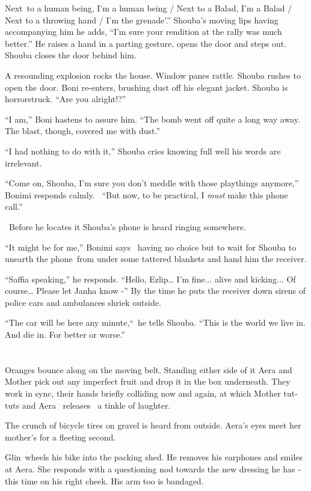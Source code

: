 \documentclass[twoside,11pt]{book}
\begin{document}
Next~to a human being, I'm a human being / Next to a Balad, I'm a Balad / Next to a throwing hand / I'm the
grenade'.'' Shouba's moving lips having accompanying him he adds, ``I'm sure your rendition
at the rally was much better.'' He raises a hand in a parting gesture, opens the door and steps out.
Shouba closes the door behind him.

A resounding explosion rocks the house. Window panes rattle. Shouba rushes to open the door. Boni re-enters, brushing
dust off his elegant jacket. Shouba is horrorstruck. ``Are you alright!?''

``I am,'' Boni hastens to assure him. ``The bomb went off quite a long way away. The blast, though, covered
me with dust.''

``I had nothing to do with it,'' Shouba cries knowing full well his words are irrelevant.

``Come on, Shouba, I'm sure you don't meddle with those playthings anymore,'' Bonimi responds
calmly. \ ``But now, to be practical, I \textit{must }make this phone call.''

\ Before he locates it Shouba's phone is heard ringing somewhere.

``It might be for me,'' Bonimi says \ having no choice but to wait for Shouba to unearth the
phone~from under some tattered{ }blankets and hand him the receiver.

``Saffia speaking,'' he responds. ``Hello, Ezlip{\dots} I'm fine... alive and
kicking... Of course{\dots} Please let Janha know -'' By the time he puts the receiver down sirens of
police cars and ambulances shriek outside.

``The car will be here any minute,``~he tells Shouba. ``This is the world we live
in. And die in. For better or worse.''


\bigskip

\chapter{}

Oranges bounce along on the moving belt. Standing either side of it Aera and Mother pick out any imperfect fruit and
drop it in the box underneath. They work in sync, their hands briefly colliding now and again, at which Mother tut-tuts
and Aera \ releases \ a tinkle of laughter.

The crunch of bicycle tires on gravel is heard from outside. Aera's eyes meet her mother's for a fleeting second.

Glin~wheels his bike into the packing shed. He removes his earphones and smiles at Aera. She responds with a questioning
nod towards the new dressing he has - this time on his right cheek. His arm too is bandaged.
\end{document}
